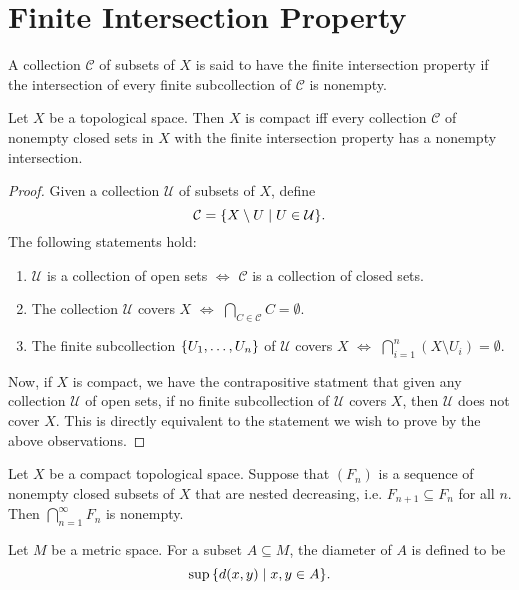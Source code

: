 \section{Finite Intersection Property}

\begin{df}
    A collection $\mathcal C$ of subsets of $X$ is said to have the finite intersection property if the intersection of every finite subcollection of $\mathcal C$ is nonempty.
\end{df}

\begin{thm}
    \label{thm:compact-fip}
    Let $X$ be a topological space. Then $X$ is compact iff every collection $\mathcal C$ of nonempty closed sets in $X$ with the finite intersection property has a nonempty intersection.
    \begin{proof}
        Given a collection $\mathcal U$ of subsets of $X$, define
        \[
        \mathcal C = {\left\{{X \setminus U \mid U\in \mathcal U}\right\}}.
        \]
        The following statements hold:
        \begin{enumerate}
            \item $\mathcal U$ is a collection of open sets $\iff$ $\mathcal C$ is a collection of closed sets.
            \item The collection $\mathcal U$ covers $X$ $\iff$ $\bigcap_{C\in \mathcal C} C = \emptyset$.
            \item The finite subcollection ${\left\{{U_1, \ldots, U_n}\right\}}$ of $\mathcal U$ covers $X$ $\iff$ $\bigcap_{i=1}^n (X\setminus U_i) = \emptyset$.
        \end{enumerate}
        Now, if $X$ is compact, we have the contrapositive statment that given any collection $\mathcal U$ of open sets, if no finite subcollection of $\mathcal U$ covers $X$, then $\mathcal U$ does not cover $X$. This is directly equivalent to the statement we wish to prove by the above observations.
    \end{proof}
\end{thm}

\begin{cl}
    Let $X$ be a compact topological space. Suppose that $(F_n)$ is a sequence of nonempty closed subsets of $X$ that are nested decreasing, i.e. $F_{n+1} \subseteq F_n$ for all $n$. Then $\bigcap_{n=1}^\infty F_n$ is nonempty.
\end{cl}

\begin{df}
    Let $M$ be a metric space. For a subset $A \subseteq M$, the diameter of $A$ is defined to be
    \[
    \sup {\left\{{d(x, y) \mid x, y \in A}\right\}}.
    \]
\end{df}

